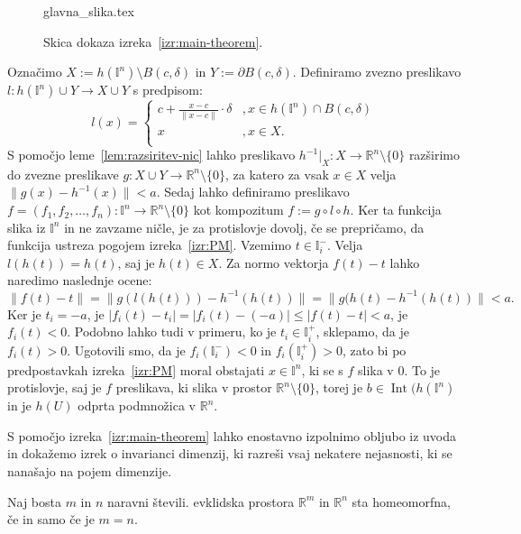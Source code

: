 \documentclass[mat1]{fmfdelo}
\newcommand{\R}{\mathbb R}
\DeclareMathOperator{\Int}{Int}
\newcommand{\I}{\mathbb I}
\newcommand{\0}{0}
\begin{document}
\begin{dokaz}
\begin{figure}[h!]
	\centering
	{glavna_slika.tex}%
	\caption{Skica dokaza izreka~\ref{izr:main-theorem}.}
\end{figure}
Označimo $X := h(\I^n) \setminus B(c, \delta)$ in $Y := \partial B(c, \delta)$. Definiramo zvezno preslikavo $l : h(\I^n) \cup Y \to X \cup Y$ s predpisom:
\[  l(x) = \left\{
\begin{array}{ll}
	c + \frac{x - c}{\| x - c \|} \cdot \delta &, x \in h(\I^n) \cap B(c, \delta) \\
	x &, x \in X. \\
\end{array} 
\right. \]
S pomočjo leme~\ref{lem:razsiritev-nic} lahko preslikavo $h^{-1}|_X : X \to \R^n \setminus \{ \0 \}$ razširimo do zvezne preslikave $g : X \cup Y \to \R^n \setminus \{ \0 \}$, za katero za vsak $x \in X$ velja $\| g(x) - h^{-1}(x) \| < a$.
Sedaj lahko definiramo preslikavo $f = (f_1, f_2, \dots, f_n) : \I^n \to \R^n \setminus \{ \0 \}$ kot kompozitum $f := g \circ l \circ h$. Ker ta funkcija slika iz $\I^n$ in ne zavzame ničle, je za protislovje dovolj, če se prepričamo, da funkcija ustreza pogojem izreka~\ref{izr:PM}. Vzemimo $t \in \I_i^-$. Velja $l(h(t)) = h(t)$, saj je $h(t) \in X$. Za normo vektorja $f(t) - t$ lahko naredimo naslednje ocene:
$$\| f(t) - t \| = \| g(l(h(t))) - h^{-1}(h(t)) \| = \| g(h(t) - h^{-1}(h(t)) \| < a.$$ 
Ker je $t_i = - a$, je $| f_i (t) - t_i | = | f_i (t) - ( - a) | \leq | f (t) - t | < a$, je $f_i(t) < 0$. Podobno lahko tudi v primeru, ko je $t_i \in \I_i^+$, sklepamo, da je $f_i(t) > 0$. Ugotovili smo, da je  $f_i(\I_i^-) < 0$ in $f_i(\I_i^+) > 0$, zato bi po predpostavkah izreka~\ref{izr:PM} moral obstajati $x \in \I^n$, ki se s $f$ slika v $0$. To je protislovje, saj je $f$ preslikava, ki slika v prostor $\R^n \setminus \{ \0 \}$, torej je $b \in \Int (h(\I^n)$ in je $h(U)$ odprta podmnožica v $\R^n$.
\end{dokaz}
S pomočjo izreka~\ref{izr:main-theorem} lahko enostavno izpolnimo obljubo iz uvoda in dokažemo izrek o invarianci dimenzij, ki razreši vsaj nekatere nejasnosti, ki se nanašajo na pojem dimenzije.
\begin{posledica}\label{izr:dim_izr}
Naj bosta $m$ in $n$ naravni števili. evklidska prostora $\R^m$ in $\R^n$ sta homeomorfna, če in samo če je $m = n$.
\end{posledica}
\end{document}
